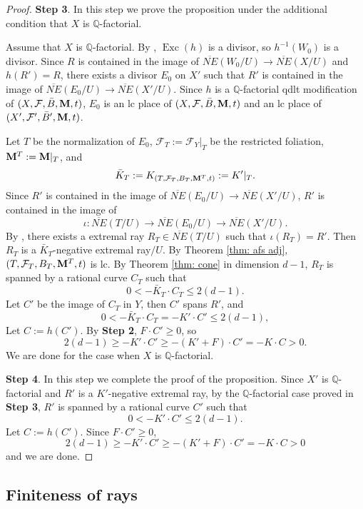 \documentclass[12pt]{amsart}
\numberwithin{equation}{section}
\newcommand{\Mm}{{\bf{M}}}
\newcommand{\Qq}{\mathbb{Q}}
\newcommand{\Exc}{\operatorname{Exc}}
\newcommand{\Ff}{\mathcal{F}}
\theoremstyle{definition}
\theoremstyle{definition}
\theoremstyle{definition}
\begin{document}
\begin{proof}
\medskip

\noindent\textbf{Step 3}. In this step we prove the proposition under the additional condition that $X$ is $\Qq$-factorial. 

Assume that $X$ is $\Qq$-factorial. By \cite[Lemma 3.6.2]{BCHM10}, $\Exc(h)$ is a divisor, so $h^{-1}(W_0)$ is a divisor. Since $R$ is contained in the image of $\overline{NE}(W_0/U)\rightarrow\overline{NE}(X/U)$ and $h(R')=R$, there exists a divisor $E_0$ on $X'$ such that $R'$ is contained in the image of $\overline{NE}(E_0/U)\rightarrow\overline{NE}(X'/U)$. Since $h$ is a $\Qq$-factorial qdlt modification of $(X,\Ff,\bar B,\Mm,t)$, $E_0$ is an lc place of $(X,\Ff,\bar B,\Mm,t)$ and an lc place of $(X',\Ff',\bar B',\Mm,t)$. 

Let $T$ be the normalization of $E_0$, $\Ff_{T}:=\Ff_Y|_{T}$ be the restricted foliation, $\Mm^{T}:=\Mm|_{T}$, and
$$\bar K_T:=K_{(T,\Ff_T,B_T,\Mm^T,t)}:=K'|_T.$$
Since $R'$ is contained in the image of $\overline{NE}(E_0/U)\rightarrow\overline{NE}(X'/U)$,  $R'$ is contained in the image of 
$$\iota: \overline{NE}(T/U)\rightarrow \overline{NE}(E_0/U)\rightarrow\overline{NE}(X'/U).$$ 
By \cite[Lemma 8.2.3]{CHLX23}, there exists a extremal ray $R_T\in\overline{NE}(T/U)$ such that $\iota(R_T)=R'$. Then $R_T$ is a $\bar K_T$-negative extremal ray$/U$. By Theorem \ref{thm: afs adj}, $(T,\Ff_T,B_T,\Mm^T,t)$ is lc. By Theorem \ref{thm: cone} in dimension $d-1$, $R_T$ is spanned by a rational curve $C_T$ such that 
$$0<-\bar K_T\cdot C_T\leq 2(d-1).$$
Let $C'$ be the image of $C_T$ in $Y$, then $C'$ spans $R'$, and
$$0<-\bar K_T\cdot C_T=-K'\cdot C'\leq 2(d-1),$$
Let $C:=h(C')$. By \textbf{Step 2}, $F\cdot C'\geq 0$, so
$$2(d-1)\geq -K'\cdot C'\geq -(K'+F)\cdot C'=-K\cdot C>0.$$
We are done for the case when $X$ is $\Qq$-factorial.

\medskip

\noindent\textbf{Step 4}. In this step we complete the proof of the proposition. Since $X'$ is $\Qq$-factorial and $R'$ is a $K'$-negative extremal ray, by the $\Qq$-factorial case proved in \textbf{Step 3}, $R'$ is spanned by a rational curve $C'$ such that
$$0<-K'\cdot C'\leq 2(d-1).$$
Let $C:=h(C')$. Since $F\cdot C'\geq 0$,
$$2(d-1)\geq -K'\cdot C'\geq -(K'+F)\cdot C'=-K\cdot C>0$$
and we are done.
\end{proof}

\subsection{Finiteness of rays}
\end{document}
